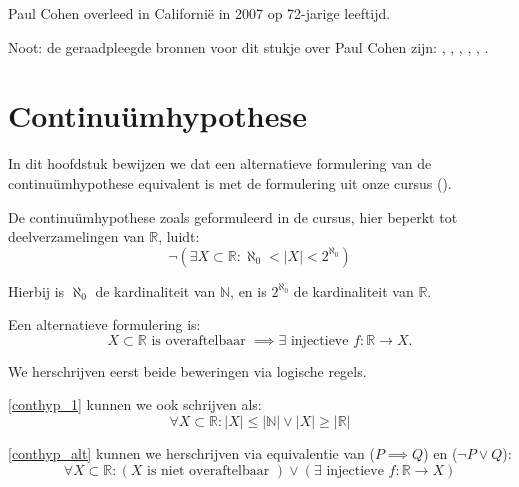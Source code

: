\documentclass[hidelinks,11pt,a4paper]{article}
\begin{document}
Paul Cohen overleed in Californi\"e in 2007 op 72-jarige leeftijd. 

Noot: de geraadpleegde bronnen voor dit stukje over Paul Cohen zijn:
\cite{wiki_en_cohen}, \cite{wiki_nl_cohen}, \cite{sarnak}, \cite{wiki_nl_fields}, \cite{wiki_en_cont}, \cite{wiki_en_hilb23}. 

\section{Continu\"umhypothese}
\label{sec_conthyp}

In dit hoofdstuk bewijzen we dat een alternatieve formulering van de continu\"um\-hypothese equivalent is met de formulering uit onze cursus (\cite{bew&red}). 

De continu\"um\-hypothese zoals geformuleerd in de cursus, hier beperkt tot deelverzamelingen van $\mathbb{R}$, luidt: 
\begin{equation}
\label{conthyp_1}
\neg ( \exists X \subset \mathbb{R} : \aleph_0 < |X| < 2^{\aleph_0} ) 
\end{equation}

Hierbij is $\aleph_0$ de kardinaliteit van $\mathbb{N}$, en is $2^{\aleph_0}$ de kardinaliteit van $\mathbb{R}$. 

Een alternatieve formulering is: 
\begin{equation}
\label{conthyp_alt}
X \subset \mathbb{R} \text{ is overaftelbaar } \implies \exists \text{ injectieve } f: \mathbb{R} \rightarrow X.
\end{equation}

We herschrijven eerst beide beweringen via logische regels. 

\eqref{conthyp_1} kunnen we ook schrijven als: 
\begin{equation}
\label{conthyp_2}
\forall X \subset \mathbb{R} : |X| \leq |\mathbb{N}| \lor |X| \geq |\mathbb{R}| 
\end{equation}

\eqref{conthyp_alt} kunnen we herschrijven via equivalentie van ($P \implies Q$) en ($\neg P \lor Q$): 
\begin{equation}
\label{conthyp_alt2}
\forall X \subset \mathbb{R} :  (X \text{ is niet overaftelbaar }) \lor (\exists \text{ injectieve } f: \mathbb{R} \rightarrow X)
\end{equation}
\end{document}
